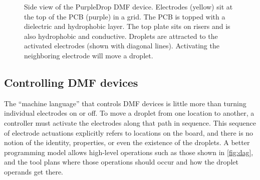 \documentclass[sigplan, screen]{acmart}
\begin{document}
\begin{figure}
  \centering

  \caption{
    Side view of the PurpleDrop DMF device.
    Electrodes (yellow) sit at the top of the PCB (purple) in a grid.
    The PCB is topped with a dielectric and hydrophobic layer.
    The top plate sits on risers and is also hydrophobic and conductive.
    Droplets are attracted to the activated electrodes (shown with diagonal lines).
    Activating the neighboring electrode will move a droplet.
  }
  \label{fig:board-side}
\end{figure}

\subsection{Controlling DMF devices}
\label{sec:dmf-software}

The ``machine language'' that controls DMF devices is little more than turning individual electrodes on or off.
To move a droplet from one location to another, a controller must activate the electrodes along that path in sequence.
This sequence of electrode actuations explicitly refers to locations on the board, and there is no notion of the identity, properties, or even the existence of the droplets.
A better programming model allows high-level operations such as those shown in \autoref{fig:dag}, and the tool plans where those operations should occur and how the droplet operands get there.
\end{document}
